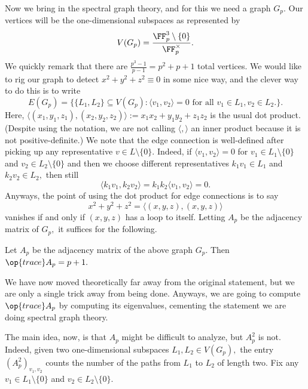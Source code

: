 Now we bring in the spectral graph theory, and for this we need a graph $G_p.$ Our vertices will be the one-dimensional subspaces as represented by
\[V(G_p)=\frac{\FF_p^3\setminus\{0\}}{\FF_p^\times}.\]
We quickly remark that there are $\frac{p^3-1}{p-1}=p^2+p+1$ total vertices. We would like to rig our graph to detect $x^2+y^2+z^2\equiv0$ in some nice way, and the clever way to do this is to write
\[E(G_p)=\big\{\{L_1,L_2\}\subseteq V(G_p):\langle v_1,v_2\rangle=0\text{ for all }v_1\in L_1,v_2\in L_2.\big\}.\]
Here, $\langle(x_1,y_1,z_1),(x_2,y_2,z_2)\rangle:=x_1x_2+y_1y_2+z_1z_2$ is the usual dot product. (Despite using the notation, we are not calling $\langle,\rangle$ an inner product because it is not positive-definite.) We note that the edge connection is well-defined after picking up any representative $v\in L\setminus\{0\}.$ Indeed, if $\langle v_1,v_2\rangle=0$ for $v_1\in L_1\setminus\{0\}$ and $v_2\in L_2\setminus\{0\}$ and then we choose different representatives $k_1v_1\in L_1$ and $k_2v_2\in L_2,$ then still
\[\langle k_1v_1,k_2v_2\rangle=k_1k_2\langle v_1,v_2\rangle=0.\]
Anyways, the point of using the dot product for edge connections is to say
\[x^2+y^2+z^2=\langle(x,y,z),(x,y,z)\rangle\]
vanishes if and only if $(x,y,z)$ has a loop to itself. Letting $A_p$ be the adjacency matrix of $G_p,$ it suffices for the following.
\begin{lemma}
    Let $A_p$ be the adjacency matrix of the above graph $G_p.$ Then $\op{trace}A_p=p+1.$
\end{lemma}
We have now moved theoretically far away from the original statement, but we are only a single trick away from being done. Anyways, we are going to compute $\op{trace}A_p$ by computing its eigenvalues, cementing the statement we are doing spectral graph theory.

The main idea, now, is that $A_p$ might be difficult to analyze, but $A_p^2$ is not. Indeed, given two one-dimensional subspaces $L_1,L_2\in V(G_p),$ the entry $\left(A_p^2\right)_{v_1,v_2}$ counts the number of the paths from $L_1$ to $L_2$ of length two. Fix any $v_1\in L_1\setminus\{0\}$ and $v_2\in L_2\setminus\{0\}.$

